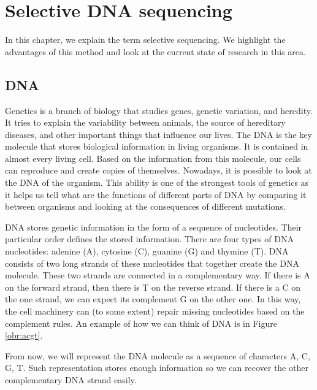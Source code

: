 \chapter{Selective DNA sequencing}
\label{kap:selSeq}

In this chapter, we explain the term selective sequencing. We highlight the
advantages of this method and look at the current state of research in this area.

\section{DNA}

Genetics is a branch of biology that studies genes, genetic variation, and heredity.
It tries to explain the variability between animals, the source of hereditary diseases, and
other important things that influence our lives. The DNA is the key molecule
that stores biological information in living organisms. It is contained in
almost every living cell. Based on the information from this molecule, our cells can reproduce and create copies of
themselves. Nowadays, it is possible to look at the DNA of the organism. This ability is
one of the strongest tools of genetics as it helps us tell what are the functions
of different parts of DNA by comparing it between organisms and looking at the
consequences of different mutations.

DNA stores genetic information in the form of a sequence of nucleotides. Their particular order defines the stored
information. There are four types of DNA nucleotides:
adenine (A), cytosine (C), guanine (G) and thymine (T). DNA consists of two long
strands of these nucleotides that together create the DNA molecule. These two strands
are connected in a complementary way. If there is A on the forward strand,
then there is T on the reverse strand. If there is a C on the one strand, we can expect
its complement G on the other one. In this way, the cell machinery can (to some extent) repair
missing nucleotides based on the complement rules. An example of how we can think
of DNA is in Figure \ref{obr:acgt}.

From now, we will represent the DNA molecule as a sequence of characters A, C, G, T.
Such representation stores enough information so we can recover the other complementary
DNA strand easily.



